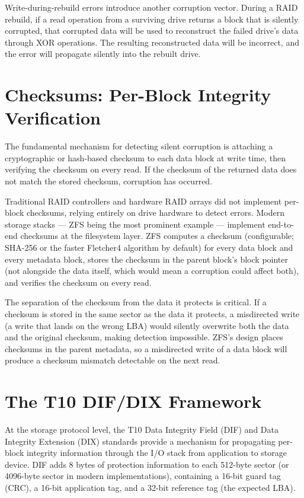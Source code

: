Write-during-rebuild errors introduce another corruption vector. During a RAID rebuild, if a read operation from a surviving drive returns a block that is silently corrupted, that corrupted data will be used to reconstruct the failed drive's data through XOR operations. The resulting reconstructed data will be incorrect, and the error will propagate silently into the rebuilt drive.

\section{Checksums: Per-Block Integrity Verification}
The fundamental mechanism for detecting silent corruption is attaching a cryptographic or hash-based checksum to each data block at write time, then verifying the checksum on every read. If the checksum of the returned data does not match the stored checksum, corruption has occurred.

Traditional RAID controllers and hardware RAID arrays did not implement per-block checksums, relying entirely on drive hardware to detect errors. Modern storage stacks --- ZFS being the most prominent example --- implement end-to-end checksums at the filesystem layer. ZFS computes a checksum (configurable; SHA-256 or the faster Fletcher4 algorithm by default) for every data block and every metadata block, stores the checksum in the parent block's block pointer (not alongside the data itself, which would mean a corruption could affect both), and verifies the checksum on every read.

The separation of the checksum from the data it protects is critical. If a checksum is stored in the same sector as the data it protects, a misdirected write (a write that lands on the wrong LBA) would silently overwrite both the data and the original checksum, making detection impossible. ZFS's design places checksums in the parent metadata, so a misdirected write of a data block will produce a checksum mismatch detectable on the next read.

\section{The T10 DIF/DIX Framework}
At the storage protocol level, the T10 Data Integrity Field (DIF) and Data Integrity Extension (DIX) standards provide a mechanism for propagating per-block integrity information through the I/O stack from application to storage device. DIF adds 8 bytes of protection information to each 512-byte sector (or 4096-byte sector in modern implementations), containing a 16-bit guard tag (CRC), a 16-bit application tag, and a 32-bit reference tag (the expected LBA).

